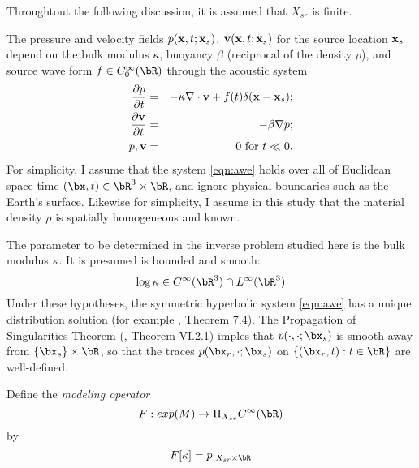 Throughtout the following discussion, it is assumed that
$X_{sr}$ is finite. 
  
The pressure and velocity fields $p({\bf x},t;{\bf x}_s)$,
${\bf v}({\bf x},t;{\bf x}_s)$ for the source location ${\bf x}_s$
depend on the bulk modulus $\kappa$, buoyancy $\beta$
(reciprocal of the density $\rho$), and source wave
form $f \in C_0^{\infty}(\bR)$ through the acoustic system
\begin{eqnarray}
  \label{eqn:awe}
 \frac{\partial p}{\partial t} & = &- \kappa \nabla \cdot {\bf v} +
                                    f(t) \delta({\bf x}-{\bf x}_s); \nonumber \\
\frac{\partial {\bf v}}{\partial t} & = & - \beta \nabla p; \\ 
p, {\bf v} & = & 0 \mbox{ for }  t \ll 0.
\end{eqnarray}
For simplicity, I assume that the system \ref{eqn:awe} holds over all of Euclidean
space-time $(\bx,t) \in \bR^3 \times \bR$, and ignore physical
boundaries such as the Earth's surface. Likewise for simplicity, I
assume in this study that the material density $\rho$ is spatially
homogeneous and known.

The parameter to be determined in the inverse problem studied here is
the bulk modulus $\kappa$. It is presumed is bounded and smooth:
\begin{equation}
  \label{eqn:coeff}
  \log \kappa \in C^{\infty}(\bR^3) \cap L^{\infty}(\bR^3)
\end{equation}
Under these hypotheses, the symmetric hyperbolic system \ref{eqn:awe}
has a unique distribution solution (for example \cite{Lax:PDENotes},
Theorem 7.4). The Propagation of
Singularities Theorem (\cite{Tay:81}, Theorem VI.2.1) %
imples that $p(\cdot,\cdot;\bx_s)$ is smooth away from $\{\bx_s\}
\times \bR$, so that the traces $p(\bx_r, \cdot;\bx_s)$ on
$\{(\bx_r,t): t \in \bR\}$ are well-defined.

Define the {\em modeling operator}
\begin{equation}
  \label{eqn:modop}
  F: exp(M)  \rightarrow \Pi_{X_{sr}} C^{\infty}(\bR)
\end{equation}
by
\begin{equation}
  \label{eqn:modopdef}
  F[\kappa]= p|_{X_{sr} \times \bR}
\end{equation}

